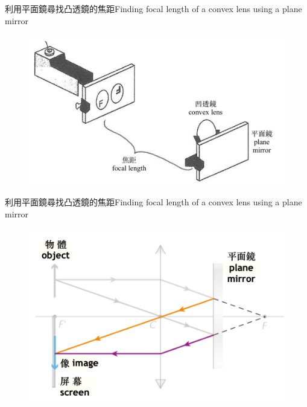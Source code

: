 \documentclass[beamer=true]{standalone}
\begin{document}
\begin{frame}{利用平面鏡尋找凸透鏡的焦距Finding focal length of a convex lens using a plane mirror}
    \begin{figure}
        \centering
        \includegraphics[width=0.75\linewidth]{assets/dd12cew8un9e8bew.png}


    \end{figure}
\end{frame}


\begin{frame}{利用平面鏡尋找凸透鏡的焦距Finding focal length of a convex lens using a plane mirror}
    \begin{figure}
        \centering
        \includegraphics[width=0.75\linewidth]{assets/denu98u23.png}


    \end{figure}
\end{frame}
\end{document}
